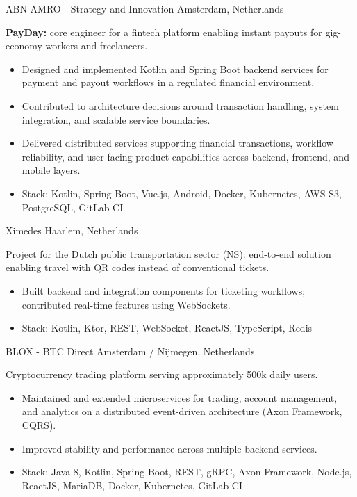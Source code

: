 \documentclass[10pt,a4paper,sans]{moderncv}
\begin{document}
{ABN AMRO - Strategy and Innovation}
{Amsterdam, Netherlands}
{}{\textbf{PayDay:} core engineer for a fintech platform enabling instant payouts for gig-economy workers and freelancers.
\begin{itemize}
 \item Designed and implemented Kotlin and Spring Boot backend services for payment and payout workflows in a regulated financial environment.
 \item Contributed to architecture decisions around transaction handling, system integration, and scalable service boundaries.
 \item Delivered distributed services supporting financial transactions, workflow reliability, and user-facing product capabilities across backend, frontend, and mobile layers.
 \item Stack: Kotlin, Spring Boot, Vue.js, Android, Docker, Kubernetes, AWS S3, PostgreSQL, GitLab CI
\end{itemize}
}

{Ximedes}
{Haarlem, Netherlands}
{}{Project for the Dutch public transportation sector (NS): end-to-end solution enabling travel with QR codes instead of conventional tickets.
\begin{itemize}
 \item Built backend and integration components for ticketing workflows; contributed real-time features using WebSockets.
 \item Stack: Kotlin, Ktor, REST, WebSocket, ReactJS, TypeScript, Redis
\end{itemize}
}

{BLOX - BTC Direct}
{Amsterdam / Nijmegen, Netherlands}
{}{Cryptocurrency trading platform serving approximately 500k daily users.
\begin{itemize}
 \item Maintained and extended microservices for trading, account management, and analytics on a distributed event-driven architecture (Axon Framework, CQRS).
 \item Improved stability and performance across multiple backend services.
 \item Stack: Java 8, Kotlin, Spring Boot, REST, gRPC, Axon Framework, Node.js, ReactJS, MariaDB, Docker, Kubernetes, GitLab CI
\end{itemize}
}
\end{document}
